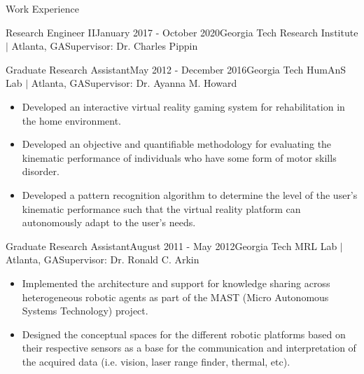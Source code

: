 \documentclass{resume} %
\begin{document}
\begin{rSection}{Work Experience}
\begin{rSubsection}{Research Engineer II}{January 2017 - October 2020}{Georgia Tech Research Institute $\vert$ Atlanta, GA}{Supervisor: Dr. Charles Pippin}
\end{rSubsection}


\begin{rSubsection}{Graduate Research Assistant}{May 2012 - December 2016}{Georgia Tech HumAnS Lab $\vert$ Atlanta, GA}{Supervisor: Dr. Ayanna M. Howard}

\item
\begin{itemize}
\item Developed an interactive virtual reality gaming system for rehabilitation
  in the home environment.

\item Developed an objective and quantifiable methodology for evaluating the
  kinematic performance of individuals who have some form of motor skills
  disorder.

\item Developed a pattern recognition algorithm to determine the level of the
  user's kinematic performance such that the virtual reality platform can
  autonomously adapt to the user's needs.

\end{itemize}

\end{rSubsection}


\begin{rSubsection}{Graduate Research Assistant}{August 2011 - May 2012}{Georgia Tech MRL Lab $\vert$ Atlanta, GA}{Supervisor: Dr. Ronald C. Arkin}

\item
\begin{itemize}

\item Implemented the architecture and support for knowledge sharing across
  heterogeneous robotic agents as part of the MAST (Micro Autonomous Systems
  Technology) project.

\item Designed the conceptual spaces for the different robotic platforms based
  on their respective sensors as a base for the communication and interpretation
  of the acquired data (i.e. vision, laser range finder, thermal, etc).

\end{itemize}

\end{rSubsection}


\end{rSection}
\end{document}
